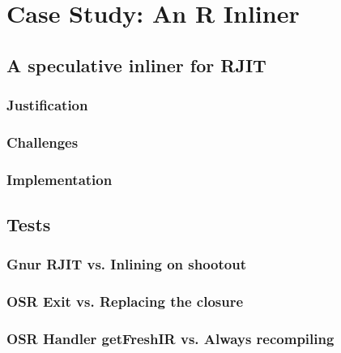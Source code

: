
\chapter{Case Study: An R Inliner} %

\label{Chapter5} %


\newcommand{\keyword}[1]{\textbf{#1}}
\newcommand{\tabhead}[1]{\textbf{#1}}
\newcommand{\code}[1]{\texttt{#1}}
\newcommand{\file}[1]{\texttt{\bfseries#1}}
\newcommand{\option}[1]{\texttt{\itshape#1}}


\section{A speculative inliner for RJIT}
\subsection{Justification}
\subsection{Challenges}
\subsection{Implementation}
\section{Tests}
\subsection{Gnur RJIT vs. Inlining on shootout}
\subsection{OSR Exit vs. Replacing the closure}
\subsection{OSR Handler getFreshIR vs. Always recompiling}


